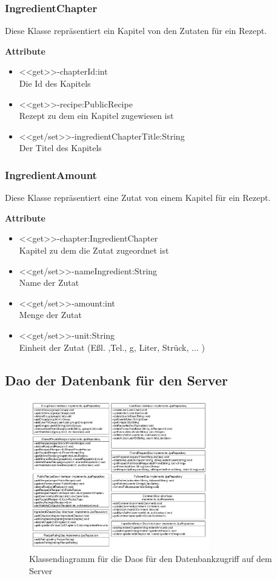 \subsubsection{IngredientChapter}
Diese Klasse repräsentiert ein Kapitel von den Zutaten für ein Rezept.

\textbf{Attribute}
\begin{itemize}
	\item <<get>>-chapterId:int \\Die Id des Kapitels
	\item <<get>>-recipe:PublicRecipe \\Rezept zu dem ein Kapitel zugewiesen ist
	\item <<get/set>>-ingredientChapterTitle:String \\Der Titel des Kapitels
\end{itemize}

\subsubsection{IngredientAmount}
Diese Klasse repräsentiert eine Zutat von einem Kapitel für ein Rezept.

\textbf{Attribute}
\begin{itemize}
	\item <<get>>-chapter:IngredientChapter \\Kapitel zu dem die Zutat zugeordnet ist
	\item <<get/set>>-nameIngredient:String \\Name der Zutat
	\item <<get/set>>-amount:int \\Menge der Zutat
	\item <<get/set>>-unit:String \\Einheit der Zutat (Eßl. ,Tel., g, Liter, Strück, ... )
\end{itemize}

\subsection{Dao der Datenbank für den Server} 

\begin{figure}[H]
	\centering
	\includegraphics[width=0.7\textwidth]{pics/ServerDaos.pdf}%
	\caption{Klassendiagramm für die Daos für den Datenbankzugriff auf dem Server}%
\end{figure}

